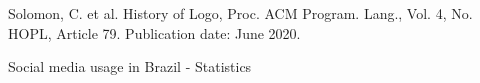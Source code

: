 \documentclass[
12pt,		%
openright,	%
twoside,  %
a4paper,			%
chapter=TITLE,		%
english,			%
french,				%
spanish,			%
brazil				%
]{USPSC-classe/USPSC}
\begin{document}
\begin{flushleft}
\begin{flushleft}
\begin{flushleft}
\begin{flushleft}
\begin{flushleft}
\begin{flushleft}
\begin{flushleft}
\begin{flushleft}
\begin{flushleft}
[SOLOMON et al., 2020] Solomon, C. et al. History of Logo, Proc. ACM Program. Lang., Vol. 4, No. HOPL, Article 79. Publication date: June 2020.
\end{flushleft}


\end{flushleft}


\end{flushleft}


\end{flushleft}


\end{flushleft}


\end{flushleft}


\end{flushleft}


\end{flushleft}


\end{flushleft}


\begin{flushleft}
\begin{flushleft}
\begin{flushleft}
\begin{flushleft}
\begin{flushleft}
\begin{flushleft}
\begin{flushleft}
\begin{flushleft}
\begin{flushleft}
[STATISTA, 2022] Social media usage in Brazil - Statistics
\end{flushleft}


\end{flushleft}


\end{flushleft}


\end{flushleft}


\end{flushleft}


\end{flushleft}


\end{flushleft}


\end{flushleft}


\end{flushleft}
\end{document}
